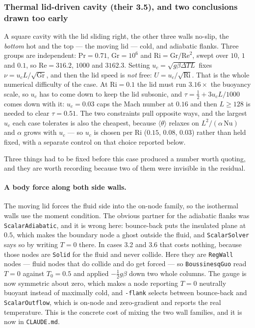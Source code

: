 \documentclass[11pt,a4paper]{article}
\newcommand{\code}[1]{\texttt{\small #1}}
\begin{document}
\subsubsection{Thermal lid-driven cavity (their 3.5), and two conclusions drawn too early}
\label{sec:zhoulid}

A square cavity with the lid sliding right, the other three walls no-slip, the
\emph{bottom} hot and the top --- the moving lid --- cold, and adiabatic flanks.
Three groups are independent: $\mathrm{Pr}=0.71$, $\mathrm{Gr}=10^6$ and
$\mathrm{Ri}=\mathrm{Gr}/\mathrm{Re}^2$, swept over $10$, $1$ and $0.1$, so
$\mathrm{Re}=316.2$, $1000$ and $3162.3$. Setting
$u_c=\sqrt{g\beta\Delta T L}$ fixes $\nu = u_c L/\sqrt{\mathrm{Gr}}$, and then
the lid speed is \emph{not} free: $U = u_c/\sqrt{\mathrm{Ri}}$. That is the whole
numerical difficulty of the case. At $\mathrm{Ri}=0.1$ the lid must run
$3.16\times$ the buoyancy scale, so $u_c$ has to come down to keep the lid
subsonic, and $\tau = \tfrac12 + 3u_cL/1000$ comes down with it: $u_c=0.03$ caps
the Mach number at $0.16$ and then $L\ge128$ is needed to clear $\tau=0.51$. The
two constraints pull opposite ways, and the largest $u_c$ each case tolerates is
also the cheapest, because $\langle\theta\rangle$ relaxes on
$L^2/(\alpha\,\mathrm{Nu})$ and $\alpha$ grows with $u_c$ --- so $u_c$ is chosen
per $\mathrm{Ri}$ ($0.15$, $0.08$, $0.03$) rather than held fixed, with a
separate control on that choice reported below.

Three things had to be fixed before this case produced a number worth quoting,
and they are worth recording because two of them were invisible in the residual.

\paragraph{A body force along both side walls.} The moving lid forces the fluid
side into the on-node family, so the isothermal walls use the moment condition.
The obvious partner for the adiabatic flanks was \code{ScalarAdiabatic}, and it
is wrong here: bounce-back puts the insulated plane at $0.5$, which makes the
boundary node a ghost outside the fluid, and \code{ScalarSolver} says so by
writing $T=0$ there. In cases 3.2 and 3.6 that costs nothing, because those
nodes are \code{Solid} for the fluid and never collide. Here they are
\code{RegWall} nodes --- fluid nodes that do collide and do get forced --- so
\code{BoussinesqGuo} read $T=0$ against $T_0=0.5$ and applied
$-\tfrac12 g\beta$ down two whole columns. The gauge is now symmetric about
zero, which makes a node reporting $T=0$ neutrally buoyant instead of maximally
cold, and \code{-flank} selects between bounce-back and \code{ScalarOutflow},
which is on-node and zero-gradient and reports the real temperature. This is the
concrete cost of mixing the two wall families, and it is now in
\code{CLAUDE.md}.
\end{document}
